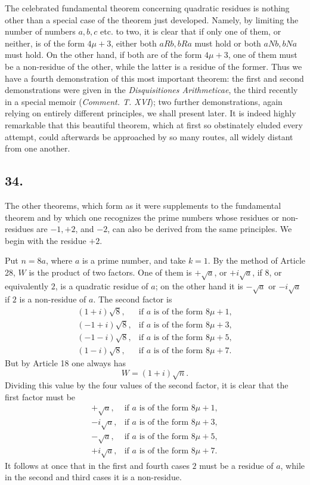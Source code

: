 \documentclass[12pt]{article}
\begin{document}
The celebrated fundamental theorem concerning quadratic residues is nothing other than a special case of the theorem just developed. Namely, by limiting the number of numbers $a,b,c$ etc. to two, it is clear that if only one of them, or neither, is of the form $4\mu+3$, either both $aRb,bRa$ must hold or both $aNb,bNa$ must hold. On the other hand, if both are of the form $4\mu+3$, one of them must be a non-residue of the other, while the latter is a residue of the former. Thus we have a fourth demonstration of this most important theorem: the first and second demonstrations were given in the \emph{Disquisitiones Arithmeticae}, the third recently in a special memoir (\emph{Comment. T. XVI}); two further demonstrations, again relying on entirely different principles, we shall present later. It is indeed highly remarkable that this beautiful theorem, which at first so obstinately eluded every attempt, could afterwards be approached by so many routes, all widely distant from one another.

\subsection*{34.}

The other theorems, which form as it were supplements to the fundamental theorem and by which one recognizes the prime numbers whose residues or non-residues are $-1,+2$, and $-2$, can also be derived from the same principles. We begin with the residue $+2$.

Put $n=8a$, where $a$ is a prime number, and take $k=1$. By the method of Article 28, $W$ is the product of two factors. One of them is $+\sqrt a$, or $+i\sqrt a$, if $8$, or equivalently $2$, is a quadratic residue of $a$; on the other hand it is $-\sqrt a$ or $-i\sqrt a$ if $2$ is a non-residue of $a$. The second factor is
\[
\begin{array}{ll}
(1+i)\sqrt8, & \text{if }a\text{ is of the form }8\mu+1,\\
(-1+i)\sqrt8, & \text{if }a\text{ is of the form }8\mu+3,\\
(-1-i)\sqrt8, & \text{if }a\text{ is of the form }8\mu+5,\\
(1-i)\sqrt8, & \text{if }a\text{ is of the form }8\mu+7.
\end{array}
\]
But by Article 18 one always has
\[
W=(1+i)\sqrt n.
\]
Dividing this value by the four values of the second factor, it is clear that the first factor must be
\[
\begin{array}{ll}
+\sqrt a, & \text{if }a\text{ is of the form }8\mu+1,\\
-i\sqrt a, & \text{if }a\text{ is of the form }8\mu+3,\\
-\sqrt a, & \text{if }a\text{ is of the form }8\mu+5,\\
+i\sqrt a, & \text{if }a\text{ is of the form }8\mu+7.
\end{array}
\]
It follows at once that in the first and fourth cases $2$ must be a residue of $a$, while in the second and third cases it is a non-residue.
\end{document}
